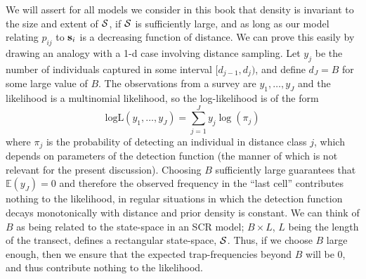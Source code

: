 We will assert for all models we consider in this book that density is
invariant to the size and extent of ${\cal S}$, if ${\cal S}$ is
sufficiently large, and as long as our model relating $p_{ij}$ to
${\bf s}_{i}$ is a decreasing function of distance.  We can prove this
easily by drawing an analogy with a 1-d case involving distance
sampling.  Let $y_{j}$ be the number of individuals captured in some
interval $[d_{j-1},d_{j})$, and define $d_{J} = B$ for some large
value of $B$.
 The observations from a survey are $y_{1},\ldots,y_J$
and the likelihood is a multinomial likelihood, so the log-likelihood
is of the form
\[
\mbox{logL}(y_{1},\ldots,y_{J}) = \sum_{j=1}^{J} y_{j} \log( \pi_{j} )
\]
where $\pi_{j}$ is the probability of detecting an individual in
distance class $j$, which depends on parameters of the detection
function (the manner of which is not relevant for the present
discussion).  Choosing $B$ sufficiently large guarantees that
$\mathbb{E}(y_{J}) = 0$ and therefore the observed frequency in the
``last cell'' contributes nothing to the likelihood, in regular
situations in which the detection function decays monotonically with
distance and prior density is constant.  We can think of $B$ as being
related to the state-space in an SCR model; $B \times L$, $L$ being
the length of the transect, defines a rectangular state-space, ${\cal
  S}$. Thus, if we choose $B$ large enough, then we ensure that the
expected trap-frequencies beyond $B$ will be 0, and thus contribute
nothing to the likelihood.

